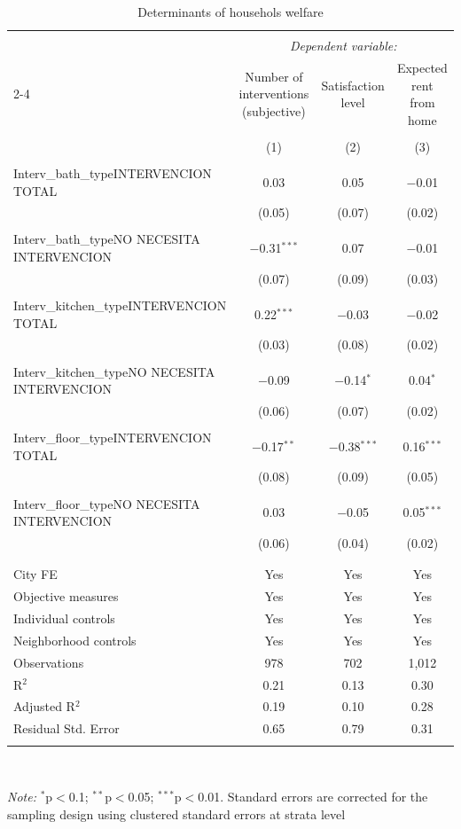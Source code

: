  \begin{table}[H] \centering    \caption{Determinants of househols welfare}    \label{reg_prod_pca}  \tiny  \begin{tabularx}{0.9\textwidth}{@{\extracolsep{-7pt}}lccc}  \\[-1.8ex]\hline  \hline \\[-1.8ex]   & \multicolumn{3}{c}{\textit{Dependent variable:}} \\  \cline{2-4}   & Number of interventions (subjective) & Satisfaction level & Expected rent from home \\  \\[-1.8ex] & (1) & (2) & (3)\\  \hline \\[-1.8ex]   Interv\_bath\_typeINTERVENCION TOTAL & 0.03 & 0.05 & $-$0.01 \\    & (0.05) & (0.07) & (0.02) \\    & & & \\   Interv\_bath\_typeNO NECESITA INTERVENCION & $-$0.31$^{***}$ & 0.07 & $-$0.01 \\    & (0.07) & (0.09) & (0.03) \\    & & & \\   Interv\_kitchen\_typeINTERVENCION TOTAL & 0.22$^{***}$ & $-$0.03 & $-$0.02 \\    & (0.03) & (0.08) & (0.02) \\    & & & \\   Interv\_kitchen\_typeNO NECESITA INTERVENCION & $-$0.09 & $-$0.14$^{*}$ & 0.04$^{*}$ \\    & (0.06) & (0.07) & (0.02) \\    & & & \\   Interv\_floor\_typeINTERVENCION TOTAL & $-$0.17$^{**}$ & $-$0.38$^{***}$ & 0.16$^{***}$ \\    & (0.08) & (0.09) & (0.05) \\    & & & \\   Interv\_floor\_typeNO NECESITA INTERVENCION & 0.03 & $-$0.05 & 0.05$^{***}$ \\    & (0.06) & (0.04) & (0.02) \\    & & & \\  \hline \\[-1.8ex]  City FE & Yes & Yes & Yes \\  Objective measures & Yes & Yes & Yes \\  Individual controls & Yes & Yes & Yes \\  Neighborhood controls & Yes & Yes & Yes \\  Observations & 978 & 702 & 1,012 \\  R$^{2}$ & 0.21 & 0.13 & 0.30 \\  Adjusted R$^{2}$ & 0.19 & 0.10 & 0.28 \\  Residual Std. Error & 0.65 & 0.79 & 0.31 \\  \hline  \hline \\[-1.8ex]  \end{tabularx} \\ \parbox[]{\textwidth}{\textit{Note:} $^{*}$p$<$0.1; $^{**}$p$<$0.05; $^{***}$p$<$0.01. Standard errors are corrected for the sampling design using clustered standard errors at strata level }  \end{table} 